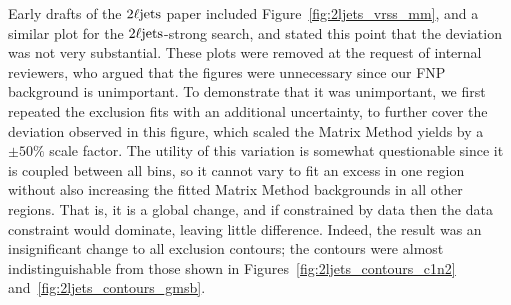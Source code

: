 Early drafts of the $2\ell\mathrm{jets}$ paper included
Figure~\ref{fig:2ljets_vrss_mm}, and a similar plot for the
$2\ell\mathrm{jets}$-strong search, and stated this point that the deviation was not
very substantial.
These plots were removed at the request of internal reviewers, who argued that
the figures were unnecessary since our FNP background is unimportant.
To demonstrate that it was unimportant, we first repeated the exclusion fits
with an additional uncertainty, to further cover the deviation observed in this
figure, which scaled the Matrix Method yields by a $\pm 50\%$ scale factor.
The utility of this variation is somewhat questionable since it is coupled
between all bins, so it cannot vary to fit an excess in one region
without also increasing the fitted Matrix Method backgrounds in all other
regions.
That is, it is a global change, and if constrained by data then the data
constraint would dominate, leaving little difference.
Indeed, the result was an insignificant change to all exclusion contours;
the contours were almost indistinguishable from those shown in
Figures~\ref{fig:2ljets_contours_c1n2} and~\ref{fig:2ljets_contours_gmsb}.

